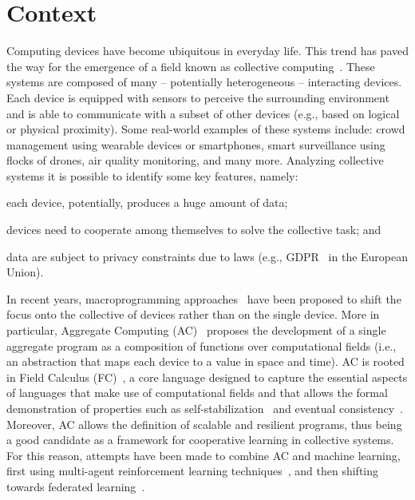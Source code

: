 \documentclass[runningheads]{llncs}
\begin{document}
\section{Context}
Computing devices have become ubiquitous in everyday life.
%
This trend has paved the way for the emergence of a field known as collective computing~\cite{DBLP:journals/computer/Abowd16}.
%
These systems are composed of many -- potentially heterogeneous -- interacting devices. 
%
Each device is equipped with sensors to perceive the surrounding environment and is able to communicate with a subset of other devices 
 (e.g., based on logical or physical proximity). %
%
Some real-world examples of these systems include: 
 crowd management using wearable devices or smartphones,
 smart surveillance using flocks of drones, 
 air quality monitoring, and many more. 
%
Analyzing collective systems it is possible to identify some key features, namely:
\begin{enumerate*}[label=(\roman*)]
    \item each device, potentially, produces a huge amount of data;
    \item devices need to cooperate among themselves to solve the collective task; and
    \item data are subject to privacy constraints due to laws (e.g., GDPR~\cite{GDPR} in the European Union).
\end{enumerate*}

In recent years, macroprogramming approaches~\cite{DBLP:journals/csur/Casadei23} have been proposed to shift the focus onto the collective of devices
 rather than on the single device.
%
More in particular, Aggregate Computing (AC)~\cite{DBLP:journals/computer/BealPV15} proposes the development of a single aggregate program as a 
 composition of functions over computational fields (i.e., an abstraction that maps each device to a value in space and time). 
%
AC is rooted in Field Calculus (FC)~\cite{DBLP:conf/forte/AudritoVDPB19}, a core language designed to capture the essential aspects of languages that make use of
 computational fields and that allows the formal demonstration of properties such as 
 self-stabilization~\cite{DBLP:conf/coordination/ViroliD14} and eventual consistency~\cite{DBLP:journals/taas/BealVPD17}.
%
Moreover, AC allows the definition of scalable and resilient programs, thus being a good candidate as a framework 
 for cooperative learning in collective systems.
%
%
For this reason, attempts have been made to combine AC and machine learning, first using multi-agent reinforcement learning 
techniques~\cite{DBLP:conf/coordination/AguzziCV22,DBLP:conf/acsos/AguzziVE23,DBLP:conf/coordination/DominiCAV23,DBLP:journals/scp/DominiCAV24,DBLP:conf/woa/DominiFAV24}, 
and then shifting towards federated learning~\cite{DBLP:conf/coordination/DominiAEV24,DBLP:conf/acsos/DominiFAVE24}. 
\end{document}
